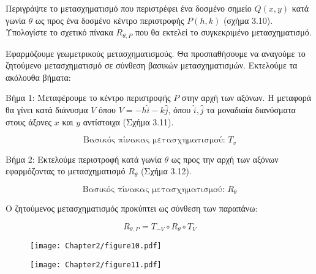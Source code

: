 \begin{example}
Περιγράψτε το μετασχηματισμό που περιστρέφει ένα δοσμένο σημείο $Q(x, y)$ κατά γωνία $\theta$ ως προς ένα δοσμένο κέντρο περιστροφής $P(h, k)$ (σχήμα 3.10). Υπολογίστε το σχετικό πίνακα $R_{\theta, P}$ που θα εκτελεί το συγκεκριμένο μετασχηματισμό.

\end{example}

\begin{solution}
	


Εφαρμόζουμε γεωμετρικούς μετασχηματισμούς. Θα προσπαθήσουμε να αναγούμε το ζητούμενο μετασχηματισμό σε σύνθεση βασικών μετασχηματισμών. Εκτελούμε τα ακόλουθα βήματα:

Βήμα 1: Μεταφέρουμε το κέντρο περιστροφής $P$ στην αρχή των αξόνων. Η μεταφορά θα γίνει κατά διάνυσμα $V$ όπου $V = -h\hat{i} - k\hat{j}$, όπου $\hat{i}, \hat{j}$ τα μοναδιαία διανύσματα στους άξονες $x$ και $y$ αντίστοιχα (Σχήμα 3.11).

\[
\text{Βασικός πίνακας μετασχηματισμού: } T_v
\]



Βήμα 2: Εκτελούμε περιστροφή κατά γωνία $\theta$ ως προς την αρχή των αξόνων εφαρμόζοντας το μετασχηματισμό $R_\theta$ (Σχήμα 3.12).

\[
\text{Βασικός πίνακας μετασχηματισμού: } R_\theta
\]



Ο ζητούμενος μετασχηματισμός προκύπτει ως σύνθεση των παραπάνω:

\[
R_{\theta,P} = T_{-V} \circ R_\theta \circ T_V
\]

\begin{figure}[h!]
	\begin{center}
		\begin{minipage}[b]{0.48\textwidth} %
		    \texttt{[image: Chapter2/figure10.pdf]}
		\end{minipage}%
	\hfill
		\begin{minipage}[b]{0.48\textwidth} %
			    \texttt{[image: Chapter2/figure11.pdf]}
		\end{minipage}
	\end{center}
\end{figure}



\end{solution}
